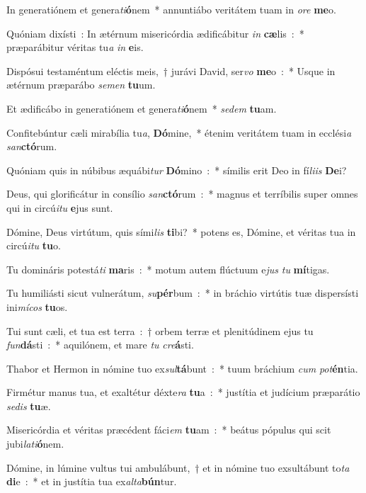 \item In generatiónem et genera\emph{ti}\textbf{ó}nem~* annuntiábo veritátem tuam in \emph{o}\emph{re} \textbf{me}o.
\item Quóniam dixísti~: In ætérnum misericórdia ædificábitur \emph{in} \textbf{cæ}lis~:~* præparábitur véritas tu\emph{a} \emph{in} \textbf{e}is.
\item Dispósui testaméntum eléctis meis,~† jurávi David, ser\emph{vo} \textbf{me}o~:~* Usque in ætérnum præparábo \emph{se}\emph{men} \textbf{tu}um.
\item Et ædificábo in generatiónem et genera\emph{ti}\textbf{ó}nem~* \emph{se}\emph{dem} \textbf{tu}am.
\item Confitebúntur cæli mirabília tu\emph{a}, \textbf{Dó}mine,~* étenim veritátem tuam in ecclési\emph{a} \emph{san}\textbf{ctó}rum.
\item Quóniam quis in núbibus æquábi\emph{tur} \textbf{Dó}mino~:~* símilis erit Deo in fí\emph{li}\emph{is} \textbf{De}i?
\item Deus, qui glorificátur in consílio \emph{san}\textbf{ctó}rum~:~* magnus et terríbilis super omnes qui in circú\emph{i}\emph{tu} \textbf{e}jus sunt.
\item Dómine, Deus virtútum, quis sími\emph{lis} \textbf{ti}bi?~* potens es, Dómine, et véritas tua in circú\emph{i}\emph{tu} \textbf{tu}o.
\item Tu domináris potestá\emph{ti} \textbf{ma}ris~:~* motum autem flúctuum e\emph{jus} \emph{tu} \textbf{mí}tigas.
\item Tu humiliásti sicut vulnerátum, \emph{su}\textbf{pér}bum~:~* in bráchio virtútis tuæ dispersísti ini\emph{mí}\emph{cos} \textbf{tu}os.
\item Tui sunt cæli, et tua est terra~:~† orbem terræ et plenitúdinem ejus tu \emph{fun}\textbf{dá}sti~:~* aquilónem, et mare \emph{tu} \emph{cre}\textbf{á}sti.
\item Thabor et Hermon in nómine tuo ex\emph{sul}\textbf{tá}bunt~:~* tuum bráchium \emph{cum} \emph{pot}\textbf{én}tia.
\item Firmétur manus tua, et exaltétur déxte\emph{ra} \textbf{tu}a~:~* justítia et judícium præparátio \emph{se}\emph{dis} \textbf{tu}æ.
\item Misericórdia et véritas præcédent fáci\emph{em} \textbf{tu}am~:~* beátus pópulus qui scit jubi\emph{la}\emph{ti}\textbf{ó}nem.
\item Dómine, in lúmine vultus tui ambulábunt,~† et in nómine tuo exsultábunt to\emph{ta} \textbf{di}e~:~* et in justítia tua ex\emph{al}\emph{ta}\textbf{bún}tur.

